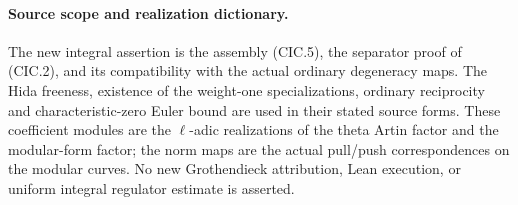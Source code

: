 \paragraph{Source scope and realization dictionary.}
The new integral assertion is the assembly (CIC.5),
the separator proof of (CIC.2), and its compatibility
with the actual ordinary degeneracy maps.  The
Hida freeness, existence of the weight-one
specializations, ordinary reciprocity and
characteristic-zero Euler bound are used in their
stated source forms.  These coefficient modules are
the $\ell$-adic realizations of the theta Artin
factor and the modular-form factor; the norm maps
are the actual pull/push correspondences on the
modular curves.  No new Grothendieck attribution,
Lean execution, or uniform integral regulator
estimate is asserted.
